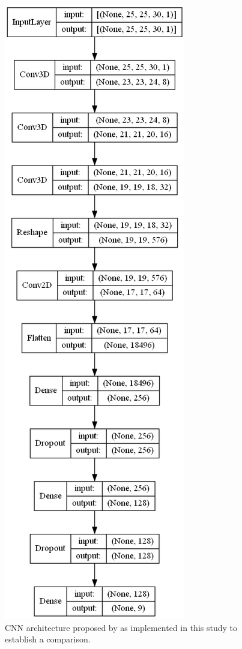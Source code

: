 \begin{figure}[bp]
    \centering
    \includegraphics[width=\linewidth]{figs/vineyard_classification/networks/hybrid_sn_25x24_8.png}
	\caption{CNN architecture proposed by \cite{roy_hybridsn_2020} as implemented in this study to establish a comparison. }
	\label{fig:hybridsn_cnn}
\end{figure}

